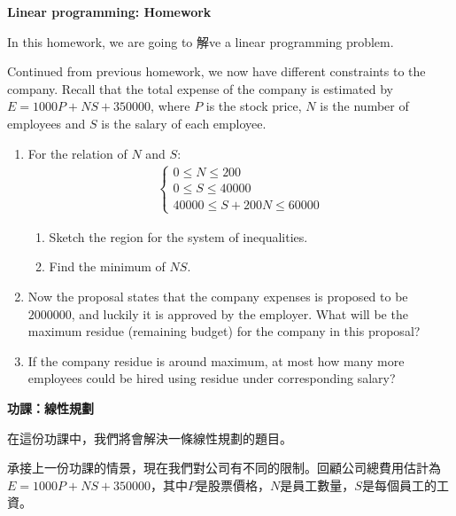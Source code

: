 \documentclass[12pt]{article}
\begin{document}
    \begin{center}
        \textbf{Linear programming: Homework}
    \end{center}

    In this homework, we are going to 解ve a linear programming problem.

    Continued from previous homework, we now have different constraints to the company. Recall that the total expense of the company is estimated by $E=1000P+NS+350000$, where $P$ is the stock price, $N$ is the number of employees and $S$ is the salary of each employee.

    \begin{enumerate}
        \item For the relation of $N$ and $S$:\begin{align*}
            \begin{cases}
                0\leq N\leq 200\\
                0\leq S\leq 40000\\
                40000\leq S+200N \leq 60000
            \end{cases}
        \end{align*}
        \begin{enumerate}
            \item Sketch the region for the system of inequalities.
            \item Find the minimum of $NS$.
        \end{enumerate}
        \item Now the proposal states that the company expenses is proposed to be $2000000$, and luckily it is approved by the employer. What will be the maximum residue (remaining budget) for the company in this proposal?
        \item If the company residue is around maximum, at most how many more employees could be hired using residue under corresponding salary?
    \end{enumerate}

    \newpage

    \begin{center}
        \textbf{功課：線性規劃}
    \end{center}

    在這份功課中，我們將會解決一條線性規劃的題目。

    承接上一份功課的情景，現在我們對公司有不同的限制。回顧公司總費用估計為 $E=1000P+NS+350000$，其中$P$是股票價格，$N$是員工數量，$S$是每個員工的工資。
\end{document}
